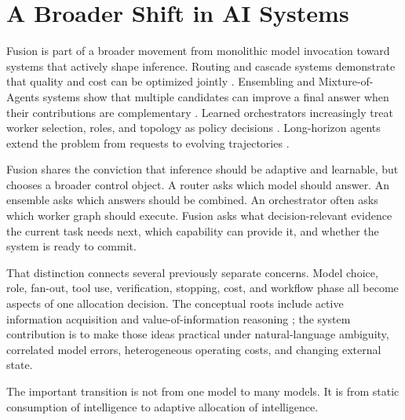 \section{A Broader Shift in AI Systems}

Fusion is part of a broader movement from monolithic model invocation toward
systems that actively shape inference. Routing and cascade systems demonstrate
that quality and cost can be optimized jointly
\citep{chen2023frugalgpt,ong2024routellm,aggarwal2024automix}. Ensembling and
Mixture-of-Agents systems show that multiple candidates can improve a final
answer when their contributions are complementary
\citep{jiang2023llmblender,wang2024moa,lu2026complementary}. Learned
orchestrators increasingly treat worker selection, roles, and topology as
policy decisions
\citep{zhang2025routerr1,yue2025masrouter,nielsen2026conductor,xu2026trinity,fugu2026}.
Long-horizon agents extend the problem from requests to evolving trajectories
\citep{zhang2026mtrouter,koh2026macu}.

Fusion shares the conviction that inference should be adaptive and learnable,
but chooses a broader control object. A router asks which model should answer.
An ensemble asks which answers should be combined. An orchestrator often asks
which worker graph should execute. Fusion asks what decision-relevant evidence
the current task needs next, which capability can provide it, and whether the
system is ready to commit.

That distinction connects several previously separate concerns. Model choice,
role, fan-out, tool use, verification, stopping, cost, and workflow phase all
become aspects of one allocation decision. The conceptual roots include active
information acquisition and value-of-information reasoning
\citep{houlsby2011bald,golovin2011adaptive}; the system contribution is to make
those ideas practical under natural-language ambiguity, correlated model
errors, heterogeneous operating costs, and changing external state.

The important transition is not from one model to many models. It is from
static consumption of intelligence to adaptive allocation of intelligence.
